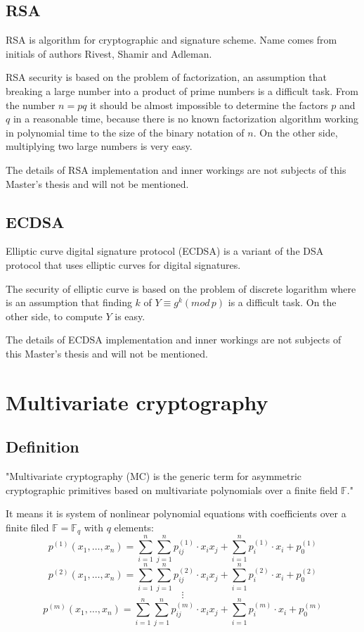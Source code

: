 \documentclass[thesis=M,english]{FITthesis}[2019/12/23]
\begin{document}
\subsection{RSA}
RSA is algorithm for cryptographic and signature scheme. Name comes from initials of authors Rivest, Shamir and Adleman.

\bigskip
\noindent
RSA security is based on the problem of factorization, an assumption that breaking a large number into a product of prime numbers is a difficult task. From the number $n = pq$ it should be almost impossible to determine the factors $p$ and $q$ in a reasonable time, because there is no known factorization algorithm working in polynomial time to the size of the binary notation of $n$. On the other side, multiplying two large numbers is very easy.

\bigskip
\noindent
The details of RSA implementation and inner workings are not subjects of this Master's thesis and will not be mentioned.

\subsection{ECDSA}
Elliptic curve digital signature protocol (ECDSA) is a variant of the DSA protocol that uses elliptic curves for digital signatures.

\bigskip
\noindent
The security of elliptic curve is based on the problem of discrete logarithm where is an assumption that finding $k$ of $Y \equiv g^k (mod \, p)$ is a difficult task. On the other side, to compute $Y$ is easy.

\bigskip
\noindent
The details of ECDSA implementation and inner workings are not subjects of this Master's thesis and will not be mentioned.

\newpage
\section{Multivariate cryptography}
\subsection{Definition}
"Multivariate cryptography (MC) is the generic term for asymmetric cryptographic primitives based on multivariate polynomials over a finite field $\mathbb{F}$."\cite{L-WIKI1}

It means it is system of nonlinear polynomial equations with coefficients over a finite filed $\mathbb{F} = \mathbb{F}_q$ with $q$ elements:
\[
	p^{(1)}(x_1,\ldots,x_n) = \sum\limits_{i=1}^{n} {\sum\limits_{j=1}^{n} {p_{ij}^{(1)} \cdot x_ix_j}} + \sum\limits_{i=1}^{n} {p_{i}^{(1)} \cdot x_i} + p_0^{(1)}
\]
\[
	p^{(2)}(x_1,\ldots,x_n) = \sum\limits_{i=1}^{n} {\sum\limits_{j=1}^{n} {p_{ij}^{(2)} \cdot x_ix_j}} + \sum\limits_{i=1}^{n} {p_{i}^{(2)} \cdot x_i} + p_0^{(2)}
\]
\[
	\vdots
\]
\[
	p^{(m)}(x_1,\ldots,x_n) = \sum\limits_{i=1}^{n} {\sum\limits_{j=1}^{n} {p_{ij}^{(m)} \cdot x_ix_j}} + \sum\limits_{i=1}^{n} {p_{i}^{(m)} \cdot x_i} + p_0^{(m)}
\]
 
\end{document}
